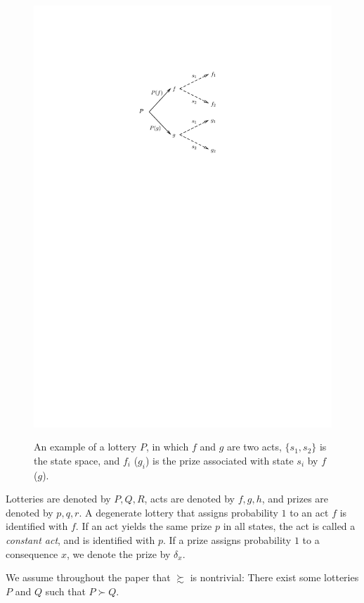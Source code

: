 \documentclass[12pt, notitlepage]{article}
\begin{document}
\begin{figure}[h!]
  \centering   \label{object}
    \includegraphics{img/object.pdf}
    \caption{An example of a
lottery $P$, in which $f$ and $g$ are two acts, $\{s_{1},s_{2}\}$ is the
state space, and $f_{i}$ ($g_{i}$) is the prize associated with state $s_{i}$
by $f$ ($g$).}
\end{figure}



Lotteries are denoted by $P,Q,R$, acts are denoted by $f,g,h$, and prizes
are denoted by $p,q,r$. A degenerate lottery that assigns probability $1$ to
an act $f$ is identified with $f$. If an act yields the same prize $p$ in
all states, the act is called a \textit{constant act}, and is identified
with $p$. If a prize assigns probability $1$ to a consequence $x$, we denote
the prize by $\delta _{x}$.

We assume throughout the paper that $\succsim $ is nontrivial: There exist
some lotteries $P$ and $Q$ such that $P\succ Q$.
\end{document}

